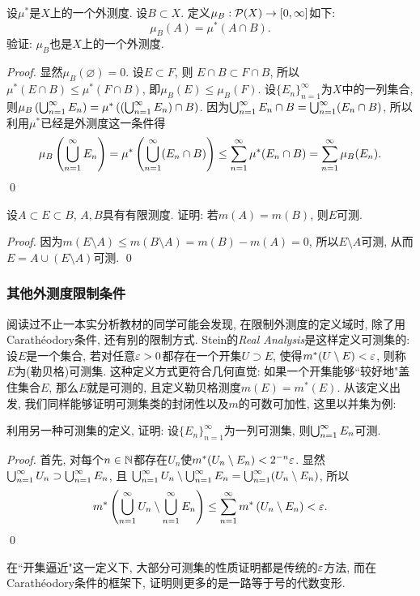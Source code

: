 \begin{exercise}
    设$\mu^*$是$X$上的一个外测度.
    设$B \subset X$. 定义$\mu_B: \mathcal{P}(X) \to [0, \infty]$如下:
    $$\mu_B(A) = \mu^*(A \cap B).$$
    验证: $\mu_B$也是$X$上的一个外测度. 
\end{exercise}
\begin{proof}
    显然$\mu_B(\varnothing) = 0$. 设$E \subset F$, 则
    $E \cap B \subset F \cap B$, 所以$\mu^*(E \cap B) \leq \mu^*(F \cap B)$, 即$\mu_B(E) \leq \mu_B(F)$. 设$\{E_n\}_{n=1}^\infty$为$X$中的一列集合, 则$\mu_B\left(\bigcup_{n=1}^{\infty}E_n\right) = \mu^*\left( \left(\bigcup_{n=1}^{\infty}E_n\right) \cap B\right)$.
    因为$\bigcup_{n=1}^{\infty}E_n \cap B = \bigcup_{n=1}^{\infty}(E_n \cap B)$, 所以利用$\mu^*$已经是外测度这一条件得
    $$\mu_B\left(\bigcup_{n=1}^{\infty}E_n\right) = \mu^*\left(\bigcup_{n=1}^{\infty}(E_n \cap B)\right) \leq \sum_{n=1}^{\infty} \mu^*(E_n \cap B) = \sum_{n=1}^{\infty} \mu_B(E_n). $$
    \qed 
\end{proof}
\begin{exercise} %
    设$A \subset E \subset B$, $A,B$具有有限测度. 证明: 若$m(A) = m(B)$, 则$E$可测.
\end{exercise}
\begin{proof}
    因为$m(E \setminus A) \leq m(B \setminus A) = m(B) - m(A) = 0$, 所以$E \setminus A$可测, 
    从而$E = A \cup (E \setminus A)$可测. \qed 
\end{proof}

\subsubsection*{其他外测度限制条件}
阅读过不止一本实分析教材的同学可能会发现, 在限制外测度的定义域时, 除了用Carath\'eodory条件, 还有别的限制方式. Stein的\textit{Real Analysis}是这样定义可测集的:
设$E$是一个集合, 若对任意$\varepsilon > 0$都存在一个开集$U \supset E$, 使得$m^*(U \setminus E) < \varepsilon$, 则称$E$为(勒贝格)可测集. 这种定义方式更符合几何直觉: 如果一个开集能够``较好地"盖住集合$E$, 那么$E$就是可测的, 且定义勒贝格测度$m(E) = m^*(E)$. 从该定义出发, 我们同样能够证明可测集类的封闭性以及$m$的可数可加性, 这里以并集为例:
\begin{example}
    利用另一种可测集的定义, 证明: 设$\{E_n\}_{n=1}^\infty$为一列可测集, 则$\bigcup_{n=1}^{\infty}E_n$可测.
\end{example}
\begin{proof}
    首先, 对每个$n \in \mathbb{N}$都存在$U_n$使$m^*(U_n \setminus E_n) < 2^{-n} \varepsilon$.
    显然$\bigcup_{n=1}^{\infty}U_n \supset \bigcup_{n=1}^{\infty}E_n$, 且
    $\bigcup_{n=1}^{\infty}U_n \setminus \bigcup_{n=1}^{\infty}E_n = \bigcup_{n=1}^{\infty} (U_n \setminus E_n)$, 所以
    $$  m^*\left(\bigcup_{n=1}^{\infty}U_n \setminus \bigcup_{n=1}^{\infty}E_n\right)
    \leq \sum_{n=1}^{\infty}m^*\left(U_n \setminus E_n\right) < \varepsilon. $$
    \qed 
\end{proof}
在``开集逼近"这一定义下, 大部分可测集的性质证明都是传统的$\varepsilon$方法, 而在Carath\'eodory条件的框架下, 证明则更多的是一路等于号的代数变形. 

